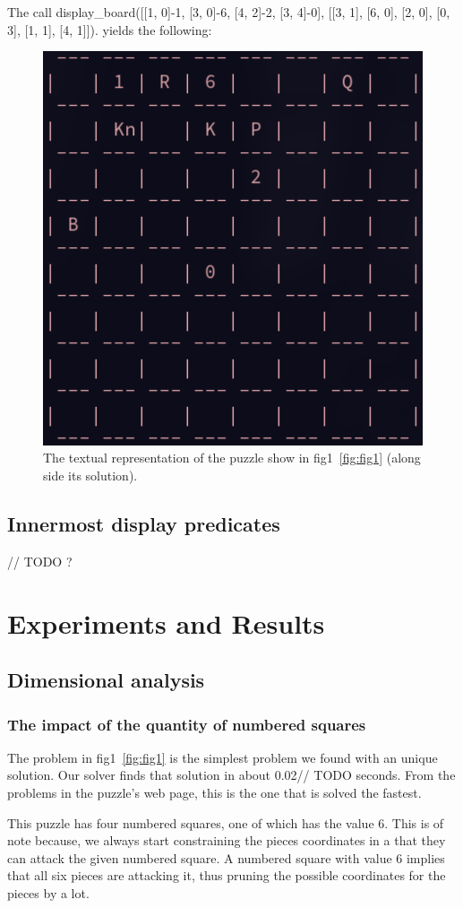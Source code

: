 \documentclass[runningheads]{llncs}
\begin{document}
The call display\_board([[1, 0]-1, [3, 0]-6, [4, 2]-2, [3, 4]-0],
[[3, 1], [6, 0], [2, 0], [0, 3], [1, 1], [4, 1]]). yields the following:
\begin{figure}[H]
\includegraphics[width=0.5\linewidth]{figures/display_board_2.png}
  \centering
  \caption{The textual representation of the puzzle show in fig1~\ref{fig:fig1}
  (along side its solution).}\label{fig3}
\end{figure}

\subsection{Innermost display predicates}

// TODO ?

\section{Experiments and Results}
\subsection{Dimensional analysis}
\subsubsection{The impact of the quantity of numbered squares}
The problem in fig1~\ref{fig:fig1} is the simplest problem we found with
an unique solution. Our solver finds that solution in about 0.02// TODO seconds.
From the problems in the puzzle's web page, this is the one that is solved
the fastest.

This puzzle has four numbered squares, one of which has the value 6. This
is of note because, we always start constraining the pieces coordinates
in a that they can attack the given numbered square. A numbered square with
value 6 implies that all six pieces are attacking it, thus pruning the
possible coordinates for the pieces by a lot.
\end{document}
